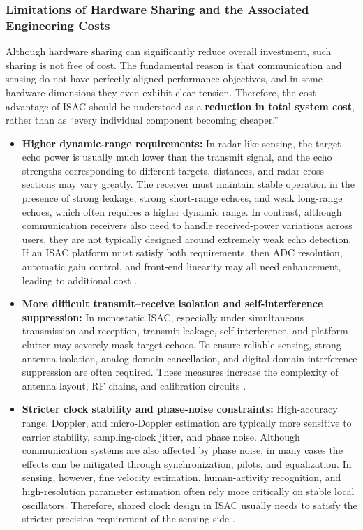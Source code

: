 \subsubsection{Limitations of Hardware Sharing and the Associated Engineering Costs}
\label{subsubsec:ch1-isac-core value-hardware-limitations}

Although hardware sharing can significantly reduce overall investment, such sharing is not free of cost. The fundamental reason is that communication and sensing do not have perfectly aligned performance objectives, and in some hardware dimensions they even exhibit clear tension. Therefore, the cost advantage of ISAC should be understood as a \textbf{reduction in total system cost}, rather than as ``every individual component becoming cheaper.''

\begin{itemize}
\item \textbf{Higher dynamic-range requirements:}  
In radar-like sensing, the target echo power is usually much lower than the transmit signal, and the echo strengths corresponding to different targets, distances, and radar cross sections may vary greatly. The receiver must maintain stable operation in the presence of strong leakage, strong short-range echoes, and weak long-range echoes, which often requires a higher dynamic range. In contrast, although communication receivers also need to handle received-power variations across users, they are not typically designed around extremely weak echo detection. If an ISAC platform must satisfy both requirements, then ADC resolution, automatic gain control, and front-end linearity may all need enhancement, leading to additional cost \cite{Wei2023Integrated}.

\item \textbf{More difficult transmit--receive isolation and self-interference suppression:}  
In monostatic ISAC, especially under simultaneous transmission and reception, transmit leakage, self-interference, and platform clutter may severely mask target echoes. To ensure reliable sensing, strong antenna isolation, analog-domain cancellation, and digital-domain interference suppression are often required. These measures increase the complexity of antenna layout, RF chains, and calibration circuits \cite{Sturm2011WaveformDesign, Hassanien2016signaling}.

\item \textbf{Stricter clock stability and phase-noise constraints:}  
High-accuracy range, Doppler, and micro-Doppler estimation are typically more sensitive to carrier stability, sampling-clock jitter, and phase noise. Although communication systems are also affected by phase noise, in many cases the effects can be mitigated through synchronization, pilots, and equalization. In sensing, however, fine velocity estimation, human-activity recognition, and high-resolution parameter estimation often rely more critically on stable local oscillators. Therefore, shared clock design in ISAC usually needs to satisfy the stricter precision requirement of the sensing side \cite{Sen2013YouAreWhat}.


\end{itemize}
